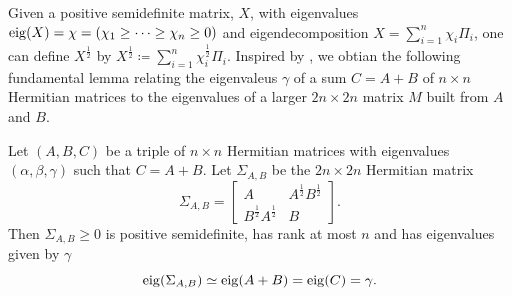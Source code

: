 \documentclass[notitlepage, 10pt]{article}
\begin{document}
Given a positive semidefinite matrix, $X$, with eigenvalues $\operatorname{eig}(X) = \chi = (\chi_1 \geq \cdots \geq \chi_n \geq 0)$ and eigendecomposition $X = {\sum}_{i=1}^{n} \chi_i \Pi_i$, one can define $X^{\frac{1}{2}}$ by $X^{\frac{1}{2}} \coloneqq {\sum}_{i=1}^{n} \chi_i^{\frac{1}{2}} \Pi_i$.
Inspired by \cite[Theorem IV.2.13]{bhatia1997matrix}, we obtian the following fundamental lemma relating the eigenvaleus $\gamma$ of a sum $C=A+B$ of $n\times n$ Hermitian matrices to the eigenvalues of a larger $2n\times 2n$ matrix $M$ built from $A$ and $B$.
\begin{lem}
    \label{lem:trigonal_block}
    Let $(A, B, C)$ be a triple of $n \times n$ Hermitian matrices with eigenvalues $(\alpha, \beta, \gamma)$ such that $C=A+B$.
    Let $\Sigma_{A,B}$ be the $2n \times 2n$ Hermitian matrix
    \begin{equation}
        \Sigma_{A,B} = \begin{bmatrix}
            A & A^{\frac{1}{2}}B^{\frac{1}{2}} \\
            B^{\frac{1}{2}}A^{\frac{1}{2}} & B
        \end{bmatrix}.
    \end{equation}
    Then $\Sigma_{A,B} \geq 0$ is positive semidefinite, has rank at most $n$ and has eigenvalues given by $\gamma$
    \begin{equation}
        \operatorname{eig}(\Sigma_{A,B}) \simeq \operatorname{eig}(A+B) = \operatorname{eig}(C) = \gamma.
    \end{equation}
\end{lem}
\end{document}
